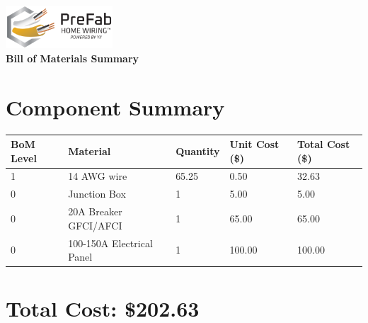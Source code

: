 \documentclass{article}
\begin{document}
\begin{center}
\includegraphics[width=0.3\textwidth]{logo.png}\\[1em]
{\LARGE \textbf{Bill of Materials Summary}}\\[0.5em]
\end{center}
\vspace{1.5em}
\section*{Component Summary}
\begin{tabular}{lllll}
\toprule
\textbf{BoM Level} & \textbf{Material} & \textbf{Quantity} & \textbf{Unit Cost (\$)} & \textbf{Total Cost (\$)} \\
\midrule
1 & 14 AWG wire & 65.25 & 0.50 & 32.63 \\
0 & Junction Box & 1 & 5.00 & 5.00 \\
0 & 20A Breaker GFCI/AFCI & 1 & 65.00 & 65.00 \\
0 & 100-150A Electrical Panel & 1 & 100.00 & 100.00 \\
\bottomrule
\end{tabular}

\section*{Total Cost: \$202.63}
\end{document}
